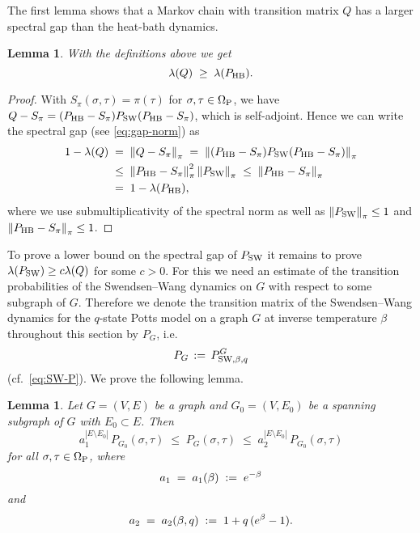 \documentclass{dis}
\newtheorem{lemma}[theorem]{Lemma}
\theoremstyle{citing}
\begin{document}
The first lemma shows that a Markov chain with 
transition matrix $Q$ has a larger spectral gap than 
the heat-bath dynamics.

\begin{lemma}	\label{lemma:Q}
With the definitions above we get 
\[
\lambda(Q) 
\;\ge\; \lambda({P_{\rm HB}}).
\]
\end{lemma}
\begin{proof}
With $S_{\pi}(\sigma,\tau)=\pi(\tau)$ for 
$\sigma,\tau\in{{\Omega}_{\rm P}}$, we have 
$Q-S_{\pi}=({P_{\rm HB}}-S_{\pi}) {P_{\rm SW}} ({P_{\rm HB}}-S_{\pi})$, 
which is self-adjoint. Hence we can write the spectral gap 
(see \eqref{eq:gap-norm}) as
\[\begin{split}
1-\lambda(Q) \;&=\; {\left\Vert {Q-S_{\pi}} \right\Vert}_{\pi} 
\;=\; {\left\Vert {({P_{\rm HB}}-S_{\pi}) {P_{\rm SW}} 
			({P_{\rm HB}}-S_{\pi})} \right\Vert}_{\pi} \\
&\le\; {\left\Vert {{P_{\rm HB}}-S_{\pi}} \right\Vert}_{\pi}^2 \,{\left\Vert {P_{\rm SW}} \right\Vert} _\pi
\;\le\; {\left\Vert {{P_{\rm HB}}-S_{\pi}} \right\Vert}_{\pi} \\
&=\; 1-\lambda({P_{\rm HB}}), 
\end{split}\]
where we use submultiplicativity of the spectral norm as well as 
${\left\Vert {P_{\rm SW}} \right\Vert}_{\pi}\le1$ and ${\left\Vert {{P_{\rm HB}}-S_{\pi}} \right\Vert}_{\pi}\le1$.
\end{proof}

To prove a lower bound on the spectral gap of ${P_{\rm SW}}$ it remains to 
prove $\lambda({P_{\rm SW}})\ge c\lambda(Q)$ for some $c>0$.
For this we need an estimate of the transition probabilities of the 
Swendsen--Wang dynamics on $G$ with respect to some subgraph of $G$. 
Therefore we denote the transition matrix of the Swendsen--Wang 
dynamics for the $q$-state Potts model on a graph $G$ at inverse 
temperature $\beta$ throughout this section by $P_G$, i.e. 
\begin{equation}\label{eq:SW-subgraph}
P_G \,:=\, P_{{\rm SW},\beta,q}^G
\end{equation}
(cf.~\eqref{eq:SW-P}).
We prove the following lemma.

\goodbreak

\begin{lemma} \label{lemma:G0}
Let $G=(V,E)$ be a graph and $G_0=(V,E_0)$ be a spanning 
subgraph of $G$ with $E_0\subset E$. 
Then
\[
a_1^{{\left\vert {E\setminus E_0} \right\vert}}\,P_{G_0}(\sigma,\tau) 
\;\le\; P_G(\sigma,\tau) 
\;\le\; a_2^{{\left\vert {E\setminus E_0} \right\vert}}\,P_{G_0}(\sigma,\tau)
\]
for all $\sigma,\tau\in{\Omega}_{\rm P}$, where
\[
a_1 \;=\; a_1(\beta) \;:=\; e^{-\beta}
\vspace{-2mm}
\]
and
\vspace{-2mm}
\[
a_2 \;=\; a_2(\beta,q) \;:=\; 1+q\, (e^{\beta}-1).
\vspace{2mm}
\]
\end{lemma}
\end{document}
